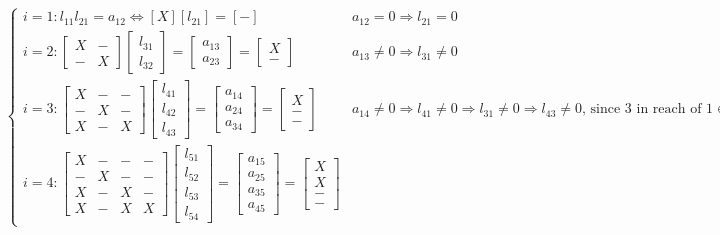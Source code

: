 \documentclass{article}
\begin{document}
\begin{align*}
    &\begin{cases}
        i=1: l_{11}l_{21} = a_{12} \Longleftrightarrow [X][l_{21}] = [-]& a_{12} = 0 \Rightarrow l_{21} = 0 \\
        i=2: \begin{bmatrix} X & -\\ - & X \end{bmatrix} \begin{bmatrix} l_{31} \\ l_{32} \end{bmatrix} = \begin{bmatrix} a_{13}\\a_{23} \end{bmatrix} = \begin{bmatrix} X\\- \end{bmatrix}& a_{13}\neq 0 \Rightarrow l_{31} \neq 0\\
        i=3: \begin{bmatrix} X & - & -\\ - & X & -\\X & - & X \end{bmatrix} \begin{bmatrix} l_{41} \\ l_{42} \\ l_{43} \end{bmatrix} = \begin{bmatrix} a_{14}\\a_{24} \\a_{34}\end{bmatrix} = \begin{bmatrix} X\\-\\- \end{bmatrix} & a_{14}\neq 0 \Rightarrow l_{41} \neq 0 \Longrightarrow l_{31}\neq 0 \Rightarrow l_{43}\neq 0 \textrm{, since $3$ in reach of $1 \in G_L$}\\
        i=4: \begin{bmatrix} X & - & -&-\\ - & X & -&-\\X & - & X &- \\X&-&X&X\end{bmatrix} \begin{bmatrix} l_{51} \\ l_{52} \\ l_{53}\\l_{54} \end{bmatrix} = \begin{bmatrix} a_{15}\\a_{25} \\a_{35}\\a_{45}\end{bmatrix} = \begin{bmatrix} X\\X\\-\\- \end{bmatrix} & 

\end{cases}
\end{align*}
\end{document}
